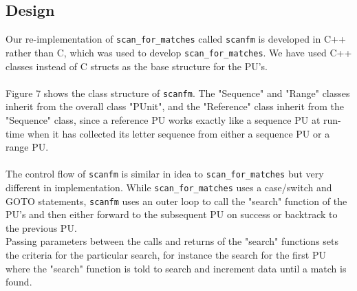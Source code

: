 \documentclass[12pt]{article}
\newcommand{\scm}{\texttt{scan\_for\_matches} }
\newcommand{\sfm}{\texttt{scanfm} }
\newcommand{\pu}{PU }
\newcommand{\pus}{PU's }
\newcommand{\pup}{PU. }
\begin{document}
\subsection{Design}
Our re-implementation of \scm called \sfm is developed in C++ rather than C, which was used to develop 
\texttt{scan\_for\_matches}. We have used C++ classes instead of C structs as the base structure for the PU's. \\ \\ 
Figure 7 shows the class structure of \texttt{scanfm}. The "Sequence" and "Range" classes inherit from the overall
class "PUnit", and the "Reference" class inherit from the "Sequence" class, since a reference \pu works exactly like a 
sequence \pu at run-time when it has collected its letter sequence from either a sequence \pu or a range \pup \\ \\
The control flow of \sfm is similar in idea to \scm but very different in implementation. While \scm uses a case/switch
and GOTO statements, \sfm uses an outer loop to call the "search" function of the \pus and then either
forward to the subsequent \pu on success or backtrack to the previous \pup \\
Passing parameters between the calls and returns of the "search" functions sets the criteria for the particular search, for
instance the search for the first \pu where the "search" function is told to search and increment data until a match is \\
found.
\end{document}
